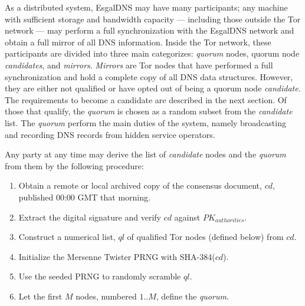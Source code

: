 As a distributed system, EsgalDNS may have many participants; any machine with sufficient storage and bandwidth capacity --- including those outside the Tor network --- may perform a full synchronization with the EsgalDNS network and obtain a full mirror of all DNS information. Inside the Tor network, these participants are divided into three main categorizes: \emph{quorum} nodes, quorum node \emph{candidates}, and \emph{mirrors}. \emph{Mirrors} are Tor nodes that have performed a full synchronization and hold a complete copy of all DNS data structures. However, they are either not qualified or have opted out of being a quorum node \emph{candidate}. The requirements to become a candidate are described in the next section. Of those that qualify, the \emph{quorum} is chosen as a random subset from the \emph{candidate} list. The \emph{quorum} perform the main duties of the system, namely broadcasting and recording DNS records from hidden service operators. 

Any party at any time may derive the list of \emph{candidate} nodes and the \emph{quorum} from them by the following procedure:

\begin{enumerate}
	\item Obtain a remote or local archived copy of the consensus document, $ cd $, published 00:00 GMT that morning.
	\item Extract the digital signature and verify $ cd $ against $ PK_{authorities} $.
	\item Construct a numerical list, $ ql $ of qualified Tor nodes (defined below) from $ cd $.
	\item Initialize the Mersenne Twister PRNG with SHA-384($ cd $).
	\item Use the seeded PRNG to randomly scramble $ ql $.
	\item Let the first $ M $ nodes, numbered $ 1 .. M $, define the \emph{quorum}.
\end{enumerate}


